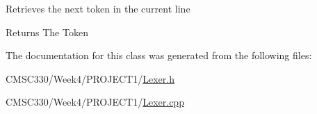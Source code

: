 Retrieves the next token in the current line \begin{DoxyReturn}{Returns}
The Token 
\end{DoxyReturn}


The documentation for this class was generated from the following files\+:\begin{DoxyCompactItemize}
\item 
C\+M\+S\+C330/\+Week4/\+P\+R\+O\+J\+E\+C\+T1/\hyperlink{_lexer_8h}{Lexer.\+h}\item 
C\+M\+S\+C330/\+Week4/\+P\+R\+O\+J\+E\+C\+T1/\hyperlink{_lexer_8cpp}{Lexer.\+cpp}\end{DoxyCompactItemize}
